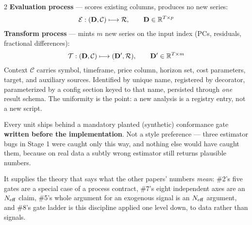 \documentclass[10pt,a4paper]{article}
\begin{document}
\begin{multicols}{2}
\textbf{Evaluation process} — scores existing columns, produces no new series:
\[
  \mathcal{E}:(\mathbf{D},\mathcal{C})\longmapsto\mathcal{R},\qquad \mathbf{D}\in\mathbb{R}^{T\times p}
\]
\textbf{Transform process} — mints $m$ new series on the input index (PCs, residuals, fractional
differences):
\[
  \mathcal{T}:(\mathbf{D},\mathcal{C})\longmapsto(\mathbf{D}',\mathcal{R}),\qquad \mathbf{D}'\in\mathbb{R}^{T\times m}
\]
Context $\mathcal{C}$ carries symbol, timeframe, price column, horizon set, cost parameters, target, and
auxiliary sources. Identified by unique name, registered by decorator, parameterized by a config section
keyed to that name, persisted through \emph{one} result schema. The uniformity is the point: a new
analysis is a registry entry, not a new script.

Every unit ships behind a mandatory planted (synthetic) conformance gate \textbf{written before the
implementation}. Not a style preference — three estimator bugs in Stage 1 were caught only this way, and
nothing else would have caught them, because on real data a subtly wrong estimator still returns
plausible numbers.

It supplies the theory that says what the other papers' numbers \emph{mean}: \#2's five gates are a
special case of a process contract, \#7's eight independent axes are an $N_{\mathrm{eff}}$ claim, \#5's whole
argument for an exogenous signal is an $N_{\mathrm{eff}}$ argument, and \#8's gate ladder is this discipline applied
one level down, to data rather than signals.

\end{multicols}

\end{document}
